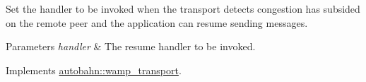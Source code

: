 Set the handler to be invoked when the transport detects congestion has subsided on the remote peer and the application can resume sending messages. 


\begin{DoxyParams}{Parameters}
{\em handler} & The resume handler to be invoked. \\
\hline
\end{DoxyParams}


Implements \hyperlink{classautobahn_1_1wamp__transport_a96ed112feb74285454180113211ce8af}{autobahn\+::wamp\+\_\+transport}.

